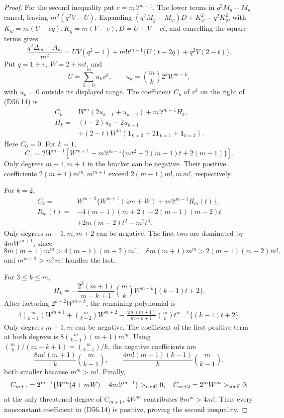\documentclass[10pt,a4paper]{amsart}
\theoremstyle{definition}
\theoremstyle{remark}
\begin{document}
\begin{proof}
For the second inequality put \(c=m!t^{m-1}\). The lower terms in
\(q^2M_y-M_w\) cancel, leaving \(m^2(q^2V-U)\). Expanding
\((q^2M_y-M_w)D+K_w^2-q^2K_y^2\), with
\(K_w=m(U-cq), K_y=m(V-c), D=U+V-ct\), and cancelling the square
terms gives
\[
\frac{q^2\Delta_m-A_m}{m^2}
=UV(q^2-1)+m!t^{m-1}\{U(t-2q)+q^2V(2-t)\}.         \tag{D56.14}
\]
Put \(q=1+v,\ W=2+mt\), and
\[
U=\sum_{k=0}^m u_kv^k,\qquad
u_k=\binom mk2^kW^{m-k},
\]
with \(u_k=0\) outside its displayed range. The coefficient \(C_k\) of
\(v^k\) on the right of (D56.14) is
\[
\begin{split}
C_k={}&W^m(2u_{k-1}+u_{k-2})+m!t^{m-1}H_k,\\
H_k={}&(t-2)u_k-2u_{k-1}\\
&+(2-t)W^m(\mathbf1_{k=0}+2\mathbf1_{k=1}+\mathbf1_{k=2}).
\end{split}                                        \tag{D56.15}
\]
Here \(C_0=0\). For \(k=1\),
\[
C_1=2W^{m-1}\!\left[
W^{m+1}-m!t^{m-1}
\{mt^2-2(m-1)t+2(m-1)\}\right].
\]
Only degrees \(m-1,m+1\) in the bracket can be negative. Their positive
coefficients \(2(m+1)m^m,m^{m+1}\) exceed
\(2(m-1)m!,m\,m!\), respectively.

For \(k=2\),
\[
\begin{split}
C_2={}&W^{m-2}\{W^{m+1}(4m+W)+m!t^{m-1}R_m(t)\},\\
R_m(t)={}&-4(m-1)(m+2)-2(m-1)(m-2)t\\
&+2m(m-2)t^2-m^2t^3.
\end{split}
\]
Only degrees \(m-1,m,m+2\) can be negative. The first two are dominated
by \(4mW^{m+1}\), since
\[
8m(m+1)m^m>
4(m-1)(m+2)m!,\quad
8m(m+1)m^m>2(m-1)(m-2)m!,
\]
and \(m^{m+2}>m^2m!\) handles the last.

For \(3\leq k\leq m\),
\[
H_k=-\frac{2^k(m+1)}{m-k+1}\binom mk
W^{m-k}\{(k-1)t+2\}.
\]
After factoring \(2^{k-2}W^{m-k}\), the remaining polynomial is
\[
\begin{split}
4\binom m{k-1}W^{m+1}+\binom m{k-2}W^{m+2}
{}-\frac{4m!(m+1)}{m-k+1}\binom mk
t^{m-1}\{(k-1)t+2\}.
\end{split}
\]
Only degrees \(m-1,m\) can be negative. The coefficient of the first
positive term at both degrees is
\(8\binom m{k-1}(m+1)m^m\). Using
\(\binom mk/(m-k+1)=\binom m{k-1}/k\), the negative coefficients are
\[
\frac{8m!(m+1)}k\binom m{k-1},\qquad
\frac{4m!(m+1)(k-1)}k\binom m{k-1},
\]
both smaller because \(m^m>m!\). Finally,
\[
C_{m+1}=2^{m-1}\{W^m(4+mW)-4m!t^{m-1}\}>_{\rm coeff}0,\quad
C_{m+2}=2^mW^m>_{\rm coeff}0;
\]
at the only threatened degree of \(C_{m+1}\),
\(4W^m\) contributes \(8m^m>4m!\). Thus every nonconstant coefficient
in (D56.14) is positive, proving the second inequality.


\end{proof}
\end{document}
